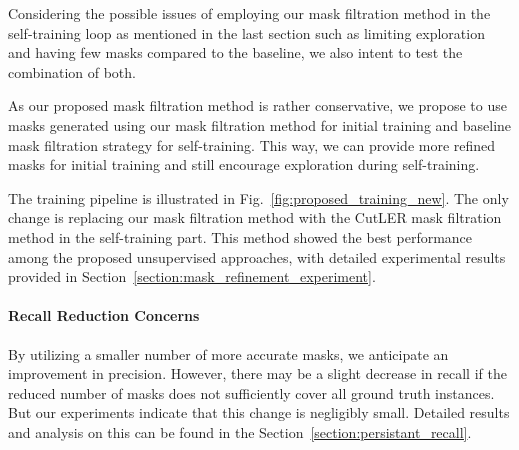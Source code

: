 Considering the possible issues of employing our mask filtration method in the self-training loop as mentioned in the last section such as limiting exploration and having few masks compared to the baseline, we also intent to test the combination of both. 

As our proposed mask filtration method is rather conservative, we propose to use masks generated using our mask filtration method for initial training and baseline mask filtration strategy for self-training. This way, we can provide more refined masks for initial training and still encourage exploration during self-training. 

The training pipeline is illustrated in Fig.~\ref{fig:proposed_training_new}. The only change is replacing our mask filtration method with the CutLER mask filtration method in the self-training part. This method showed the best performance among the proposed unsupervised approaches, with detailed experimental results provided in Section~\ref{section:mask_refinement_experiment}.

 
\paragraph{Recall Reduction Concerns}
By utilizing a smaller number of more accurate masks, we anticipate an improvement in precision. However, there may be a slight decrease in recall if the reduced number of masks does not sufficiently cover all ground truth instances. But our experiments indicate that this change is negligibly small. Detailed results and analysis on this can be found in the Section~\ref{section:persistant_recall}.





